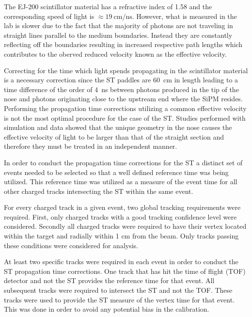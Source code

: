 The EJ-200 scintillator material has a refractive index of 1.58 \cite{ej200_specs} and the corresponding speed of light is $\approx \mathrm{19\ cm/ns}$.  However, what is measured in the lab is slower due to the fact that the majority of photons are not traveling in straight lines parallel to the medium boundaries. Instead they are constantly reflecting off the boundaries resulting in increased respective path lengths which contributes to the oberved reduced velocity known as the effective velocity.  

Correcting for the time which light spends propagating in the scintillator material is a necessary correction since the ST paddles are 60~cm in length leading to a time difference of the order of 4~ns between photons produced in the tip of the nose and photons originating close to the upstream end where the SiPM resides.  Performing the propagation time corrections utilizing a common effective velocity is not the most optimal procedure for the case of the ST.  Studies performed with simulation and data showed that the unique geometry in the nose causes the effective velocity of light to be larger than that of the straight section and therefore they must be treated in an independent manner.

In order to conduct the propagation time corrections for the ST a distinct set of events needed to be selected so that a well defined reference time was being utilized.  This reference time was utilized as a measure of the event time for all other charged tracks intersecting the ST within the same event.  

For every charged track in a given event, two global tracking requirements were required.  First, only charged tracks with a good tracking confidence level were considered.  Secondly all charged tracks were required to have their vertex located within the target and radially within 1 cm from the beam. Only tracks passing these conditions were considered for analysis.

At least two specific tracks were required in each event in order to conduct the ST propagation time corrections.  One track that has hit the time of flight (TOF) detector and not the ST provides the reference time for that event.  All subsequent tracks were required to intersect the ST and not the TOF.  These tracks were used to provide the ST measure of the vertex time for that event.  This was done in order to avoid any potential bias in the calibration.  
	


